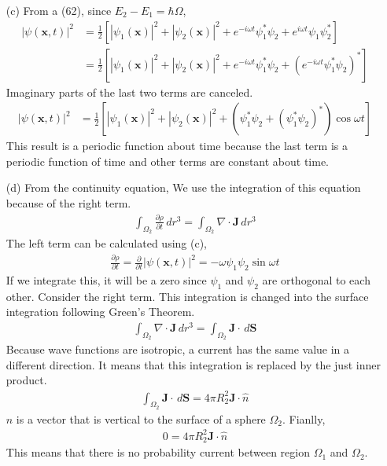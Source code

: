 \documentclass[aps,floatfix,nofootinbib,superscriptaddress,fleqn]{revtex4}
\begin{document}
\begin{itemize}
\item[(c)] From a (62), since $E_2-E_1=\hbar \Omega$,
  \begin{align}
    |\psi(\bm{x},t)|^2 &= \frac{1}{2}\left[|\psi_1(\bm{x})|^2 + |\psi_2(\bm{x})|^2+e^{-i\omega t}\psi_1^*\psi_2+e^{i\omega t}\psi_1\psi_2^*  \right]
    \\                 &= \frac{1}{2}\left[ |\psi_1(\bm{x})|^2 + |\psi_2(\bm{x})|^2 + e^{-i\omega t}\psi_1^*\psi_2 + {\left(e^{-i\omega t}\psi_1^*\psi_2\right)}^* \right]
  \end{align}
  Imaginary parts of the last two terms are canceled.
  \begin{align}  
    |\psi(\bm{x},t)|^2 &= \frac{1}{2}\left[ |\psi_1(\bm{x})|^2 + |\psi_2(\bm{x})|^2 + \left(\psi_1^*\psi_2 + {\left(\psi_1^*\psi_2\right)}^*\right)\cos{\omega t} \right]
  \end{align}
  This result is a periodic function about time because the last term is a periodic function of time and other terms are constant about time.

\item[(d)]
  From the continuity equation, We use the integration of this equation because of the right term.
    \begin{align}
      \int_{\Omega_2}\frac{\partial \rho}{\partial t}\,dr^3 = \int_{\Omega_2}\nabla \cdot \bm{J}\,dr^3
    \end{align}
  The left term can be calculated using (c),
    \begin{align}
      \frac{\partial\rho}{\partial t} = \frac{\partial}{\partial t}|\psi(\bm{x},t)|^2 = -\omega \psi_1\psi_2\sin\omega t
    \end{align}
  If we integrate this, it will be a zero since $\psi_1$ and $\psi_2$ are orthogonal to each other. Consider the right term. This integration is changed into the surface integration following Green's Theorem.
    \begin{align}
      \int_{\Omega_2}\nabla \cdot \bm{J}\,dr^3 = \int_{\Omega_2} \bm{J} \cdot\,d\bm{S}
    \end{align}
  Because wave functions are isotropic, a current has the same value in a different direction. It means that this integration is replaced by the just inner product.
    \begin{align}
      \int_{\Omega_2} \bm{J} \cdot\,d\bm{S} = 4\pi R_2^2\bm{J}\cdot\hat{n}
    \end{align}
  $\hat{n}$ is a vector that is vertical to the surface of a sphere $\Omega_2$. Fianlly,
    \begin{align}
      0 = 4\pi R_2^2\bm{J}\cdot\hat{n}
    \end{align}
  This means that there is no probability current between region $\Omega_1$ and $\Omega_2$.
  \end{itemize}
\end{document}
